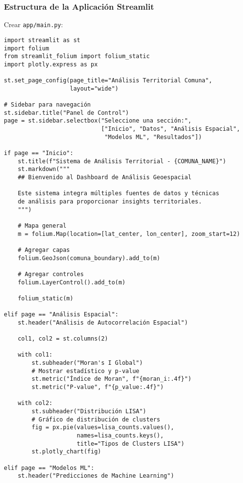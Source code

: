 \documentclass[12pt,a4paper]{article}
\begin{document}
\subsubsection{Estructura de la Aplicación Streamlit}

Crear \texttt{app/main.py}:

\begin{verbatim}
import streamlit as st
import folium
from streamlit_folium import folium_static
import plotly.express as px

st.set_page_config(page_title="Análisis Territorial Comuna",
                   layout="wide")

# Sidebar para navegación
st.sidebar.title("Panel de Control")
page = st.sidebar.selectbox("Seleccione una sección:",
                            ["Inicio", "Datos", "Análisis Espacial",
                             "Modelos ML", "Resultados"])

if page == "Inicio":
    st.title(f"Sistema de Análisis Territorial - {COMUNA_NAME}")
    st.markdown("""
    ## Bienvenido al Dashboard de Análisis Geoespacial

    Este sistema integra múltiples fuentes de datos y técnicas
    de análisis para proporcionar insights territoriales.
    """)

    # Mapa general
    m = folium.Map(location=[lat_center, lon_center], zoom_start=12)

    # Agregar capas
    folium.GeoJson(comuna_boundary).add_to(m)

    # Agregar controles
    folium.LayerControl().add_to(m)

    folium_static(m)

elif page == "Análisis Espacial":
    st.header("Análisis de Autocorrelación Espacial")

    col1, col2 = st.columns(2)

    with col1:
        st.subheader("Moran's I Global")
        # Mostrar estadístico y p-value
        st.metric("Índice de Moran", f"{moran_i:.4f}")
        st.metric("P-value", f"{p_value:.4f}")

    with col2:
        st.subheader("Distribución LISA")
        # Gráfico de distribución de clusters
        fig = px.pie(values=lisa_counts.values(),
                     names=lisa_counts.keys(),
                     title="Tipos de Clusters LISA")
        st.plotly_chart(fig)

elif page == "Modelos ML":
    st.header("Predicciones de Machine Learning")


\end{verbatim}
\end{document}
